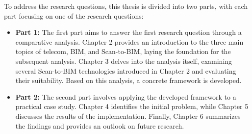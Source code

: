 \begin{English}
    To address the research questions, this thesis is divided into two parts, with each part focusing on one of the research questions:

    \begin{itemize}
        \item \textbf{Part 1:} The first part aims to answer the first research question through a comparative analysis. Chapter 2 provides an introduction to the three main topics of telecom, BIM, and Scan-to-BIM, laying the foundation for the subsequent analysis. Chapter 3 delves into the analysis itself, examining several Scan-to-BIM technologies introduced in Chapter 2 and evaluating their suitability. Based on this analysis, a concrete framework is developed.
        \item \textbf{Part 2:} The second part involves applying the developed framework to a practical case study. Chapter 4 identifies the initial problem, while Chapter 5 discusses the results of the implementation. Finally, Chapter 6 summarizes the findings and provides an outlook on future research.
    \end{itemize}
\end{English}